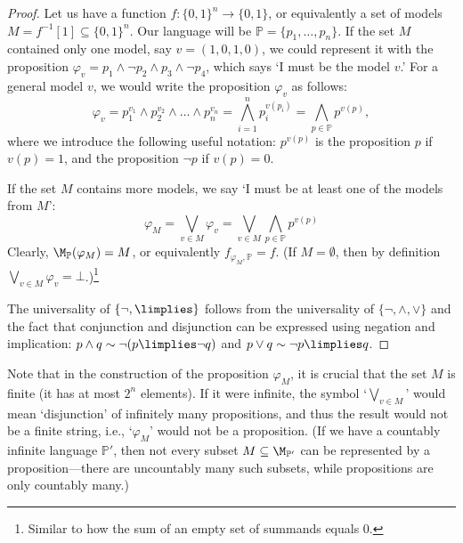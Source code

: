 \begin{proof}
Let us have a function $f\colon \{0,1\}^n\to \{0,1\}$, or equivalently a set of models $M = f^{-1}[1] \subseteq \{0,1\}^n$. Our language will be $\mathbb P = \{p_1, \dots, p_n\}$. If the set $M$ contained only one model, say $v = (1,0,1,0)$, we could represent it with the proposition $\varphi_v = p_1 \land \neg p_2 \land p_3 \land \neg p_4$, which says `I must be the model $v$.' For a general model $v$, we would write the proposition $\varphi_v$ as follows:
$$
\varphi_v = p_1^{v_1} \land p_2^{v_2} \land \dots \land p_n^{v_n} = \bigwedge_{i=1}^n p_i^{v(p_i)} = \bigwedge_{p \in \mathbb P} p^{v(p)},
$$
where we introduce the following useful notation: $p^{v(p)}$ is the proposition $p$ if $v(p) = 1$, and the proposition $\neg p$ if $v(p) = 0$.

If the set $M$ contains more models, we say `I must be at least one of the models from $M$':
$$
\varphi_M = \bigvee_{v \in M} \varphi_v = \bigvee_{v \in M} \bigwedge_{p \in \mathbb P} p^{v(p)}
$$
Clearly, $\M_\mathbb P(\varphi_M) = M$, or equivalently $f_{\varphi_M,\mathbb P} = f$. (If $M = \emptyset$, then by definition $\bigvee_{v \in M} \varphi_v = \bot$.)\footnote{Similar to how the sum of an empty set of summands equals 0.}

The universality of $\{\neg, \limplies\}$ follows from the universality of $\{\neg, \land, \lor\}$ and the fact that conjunction and disjunction can be expressed using negation and implication: $p \land q \sim \neg (p \limplies \neg q)$ and $p \lor q \sim \neg p \limplies q$.
\end{proof}

\begin{remark}
Note that in the construction of the proposition $\varphi_M$, it is crucial that the set $M$ is finite (it has at most $2^n$ elements). If it were infinite, the symbol `$\bigvee_{v \in M}$' would mean `disjunction' of infinitely many propositions, and thus the result would not be a finite string, i.e., `$\varphi_M$' would not be a proposition. (If we have a countably infinite language $\mathbb P'$, then not every subset $M \subseteq \M_{\mathbb P'}$ can be represented by a proposition---there are uncountably many such subsets, while propositions are only countably many.)
\end{remark}

